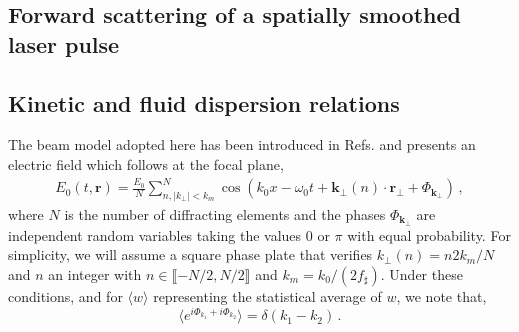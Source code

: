 \documentclass[
 reprint,
 amsmath,amssymb,
 aps,
]{revtex4-1}
\begin{document}
 \begin{widetext}
\section{Forward scattering of a spatially smoothed laser pulse}
\subsection{Kinetic and fluid dispersion relations}
The  beam model adopted here has been introduced in  Refs. \cite[]{POF_Schmitt_88,POF_Rose_93} and presents an electric field which follows at the focal plane,
 \begin{align}
E_0(t,\mathbf{r})  = \frac{E_0}{N} \sum_{n,\vert k_{\perp}\vert<k_m }^N  \cos(k_0x - \omega_0t +\mathbf{k}_\perp(n) \cdot \mathbf{r}_\perp +\Phi_{\mathbf{k}_\perp})\, , \label{eq:erpp}
 \end{align}
 where  $N$ is the number of diffracting elements and the phases $\Phi_{\mathbf{k}_\perp}$ are  independent random variables taking the values $0$ or $\pi$ with equal probability.
 For simplicity, we will assume a square phase plate that verifies $k_{\perp}(n) = n2k_m/N$ and  $n$ an integer with $n\in \llbracket - N/2 ,N/2 \rrbracket$ and $k_m = k_0/(2f_\sharp)$. 
 Under these conditions, and for $\langle w\rangle$ representing the statistical average of $w$,  we note   that,
 \begin{equation}\label{eq:d}
 \langle e^{i\Phi_{k_1}+i\Phi_{k_2}}\rangle=\delta(k_1-k_2) \, .
 \end{equation}


\end{widetext}
\end{document}
